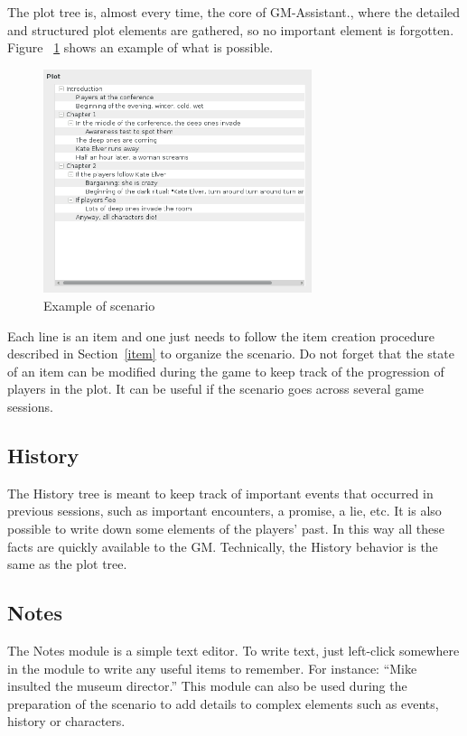 \documentclass[a4paper,12pt]{article}
\newcommand*{\GMA}{GM-Assistant\xspace}
\begin{document}
The plot tree is, almost every time, the core of \GMA., where the detailed and structured plot elements are gathered, so no important element is forgotten.
Figure ~\ref{arbre_scenar} shows an example of what is possible.
\begin{figure}[ht]
    \centerline{\includegraphics[width=0.7\textwidth]{sample_scenario}}
    \caption{Example of scenario}
    \label{arbre_scenar}
\end{figure}

Each line is an item and one just needs to follow the item creation procedure described in Section~\ref{item} to organize the scenario.
Do not forget that the state of an item can be modified during the game to keep track of the progression of players in the plot. It can be useful if the scenario goes across several game sessions.

\subsection{History}
\label{sec:history}

The History tree is meant to keep track of important events that occurred in previous sessions, such as important encounters, a promise, a lie, etc.
It is also possible to write down some elements of the players' past.
In this way all these facts are quickly available to the GM.
Technically, the History behavior is the same as the plot tree.

\subsection{Notes}
\label{sec:notes}

The Notes module is a simple text editor. To write text, just left-click somewhere in the module to write any useful items to remember.
For instance: “Mike insulted the museum director.”
This module can also be used during the preparation of the scenario to add details to complex elements such as events, history or characters.
\end{document}
